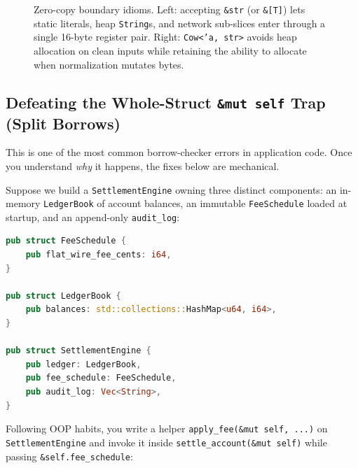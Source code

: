 \begin{figure}[H]
\caption{Zero-copy boundary idioms. Left: accepting \texttt{\&str} (or \texttt{\&[T]}) lets static literals, heap \texttt{String}s, and network sub-slices enter through a single 16-byte register pair. Right: \texttt{Cow<'a, str>} avoids heap allocation on clean inputs while retaining the ability to allocate when normalization mutates bytes.}
\label{ch08:fig-slice-views-and-cow}
\end{figure}

\subsection{Defeating the Whole-Struct \texttt{\&mut self} Trap (Split Borrows)}

This is one of the most common borrow-checker errors in application code. Once you understand \emph{why} it happens, the fixes below are mechanical.

Suppose we build a \texttt{SettlementEngine} owning three distinct components: an in-memory \texttt{LedgerBook} of account balances, an immutable \texttt{FeeSchedule} loaded at startup, and an append-only \texttt{audit\_log}:

\begin{lstlisting}[language=Rust]
pub struct FeeSchedule {
    pub flat_wire_fee_cents: i64,
}

pub struct LedgerBook {
    pub balances: std::collections::HashMap<u64, i64>,
}

pub struct SettlementEngine {
    pub ledger: LedgerBook,
    pub fee_schedule: FeeSchedule,
    pub audit_log: Vec<String>,
}
\end{lstlisting}

Following OOP habits, you write a helper \texttt{apply\_fee(\&mut self, ...)} on \texttt{SettlementEngine} and invoke it inside \texttt{settle\_account(\&mut self)} while passing \texttt{\&self.\allowbreak{}fee\_schedule}:

